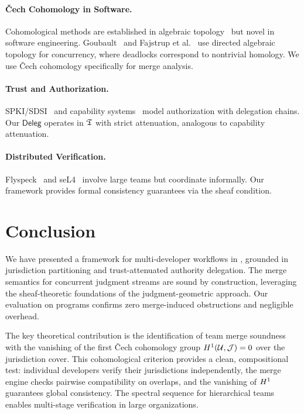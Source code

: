 \documentclass[11pt]{article}
\newcommand{\DelegCat}{\mathsf{Deleg}}
\begin{document}
\paragraph{\v{C}ech Cohomology in Software.}
Cohomological methods are established in algebraic
topology~\cite{hartshorne1977algebraic,bott1982differential} but novel in
software engineering. Goubault~\cite{goubault2000geometry} and
Fajstrup et al.~\cite{fajstrup2016directed} use directed algebraic topology
for concurrency, where deadlocks correspond to nontrivial homology. We use
\v{C}ech cohomology specifically for merge analysis.

\paragraph{Trust and Authorization.}
SPKI/SDSI~\cite{ellison1999spki} and capability systems~\cite{miller2006robust}
model authorization with delegation chains. Our $\DelegCat$ operates in $\mathfrak{T}$
with strict attenuation, analogous to capability attenuation.

\paragraph{Distributed Verification.}
Flyspeck~\cite{hales2017formal} and seL4~\cite{klein2009sel4} involve large
teams but coordinate informally. Our framework provides formal consistency
guarantees via the sheaf condition.

\section{Conclusion}\label{sec:conclusion}

We have presented a framework for multi-developer workflows in \JuGeo{},
grounded in jurisdiction partitioning and trust-attenuated authority delegation.
The merge semantics for concurrent judgment streams are sound by construction,
leveraging the sheaf-theoretic foundations of the judgment-geometric approach.
Our evaluation on \expTotalPrograms{} programs confirms zero merge-induced
obstructions and negligible overhead.

The key theoretical contribution is the identification of team merge soundness
with the vanishing of the first \v{C}ech cohomology group
$H^{1}(\mathcal{U}, \mathcal{J}) = 0$ over the jurisdiction cover. This
cohomological criterion provides a clean, compositional test: individual
developers verify their jurisdictions independently, the merge engine checks
pairwise compatibility on overlaps, and the vanishing of $H^{1}$ guarantees
global consistency. The spectral sequence for hierarchical teams enables
multi-stage verification in large organizations.
\end{document}
